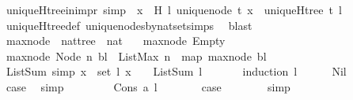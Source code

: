 \begin{isabellebody}
\ uniqueH{\isacharunderscore}tree{\isacharunderscore}in{\isacharunderscore}imp{\isacharunderscore}r\ {\isacharbrackleft}simp{\isacharbrackright}{\isacharcolon}\ {\isachardoublequoteopen}{\isacharparenleft}{\isasymforall}\ x\ {\isasymin}\ H\ l{\isachardot}\ unique{\isacharunderscore}node\ t\ x{\isacharparenright}\ {\isasymlongrightarrow}\ uniqueH{\isacharunderscore}tree\ t\ l{\isachardoublequoteclose}\isanewline
%
\isadelimproof
\ \ %
\endisadelimproof
%
\isatagproof
{}\isamarkupfalse%
\ uniqueH{\isacharunderscore}tree{\isacharunderscore}def\ unique{\isacharunderscore}nodes{\isacharunderscore}by{\isacharunderscore}nat{\isacharunderscore}set{\isachardot}simps\ \isamarkupfalse%
\ blast%
\endisatagproof
{\isafoldproof}%
%
\isadelimproof
\isanewline
%
\endisadelimproof
\ \ \ \ \isanewline
{}\isamarkupfalse%
\ max{\isacharunderscore}node\ {\isacharcolon}{\isacharcolon}\ {\isachardoublequoteopen}nattree\ {\isasymRightarrow}\ nat{\isachardoublequoteclose}\ \isanewline
\ \ {\isachardoublequoteopen}max{\isacharunderscore}node\ Empty\ {\isacharequal}\ {}{\isachardoublequoteclose}\isanewline
{\isacharbar}\ {\isachardoublequoteopen}max{\isacharunderscore}node\ {\isacharparenleft}Node\ n\ bl{\isacharparenright}\ {\isacharequal}\ ListMax\ {\isacharparenleft}n\ {\isacharhash}\ {\isacharparenleft}map\ max{\isacharunderscore}node\ bl{\isacharparenright}{\isacharparenright}{\isachardoublequoteclose}\isanewline
\isanewline
{}\isamarkupfalse%
\ ListSum{\isacharunderscore}{}\ {\isacharbrackleft}simp{\isacharbrackright}\ {\isacharcolon}{\isachardoublequoteopen}{\isacharparenleft}{\isasymforall}x\ {\isasymin}\ set\ l{\isachardot}\ x\ {\isacharequal}\ {}{\isacharparenright}\ {\isasymlongrightarrow}\ ListSum\ l\ {\isacharequal}\ {}{\isachardoublequoteclose}\ \isanewline
%
\isadelimproof
\ \ %
\endisadelimproof
%
\isatagproof
{}\isamarkupfalse%
\ {\isacharparenleft}induction\ l{\isacharparenright}\isanewline
\ \ \ \ \isamarkupfalse%
\ Nil\isanewline
\ \ \ \ \isamarkupfalse%
\ \isamarkupfalse%
\ {\isacharquery}case\ \isamarkupfalse%
\ simp\isanewline
\ \ \isamarkupfalse%
\isanewline
\ \ \ \ \isamarkupfalse%
\ {\isacharparenleft}Cons\ a\ l{\isacharparenright}\isanewline
\ \ \ \ \isamarkupfalse%
\ \isamarkupfalse%
\ {\isacharquery}case\isanewline
\ \ \ \ \ \ \isamarkupfalse%
\ simp\ \isanewline
\ \ \isamarkupfalse%

\end{isabellebody}
